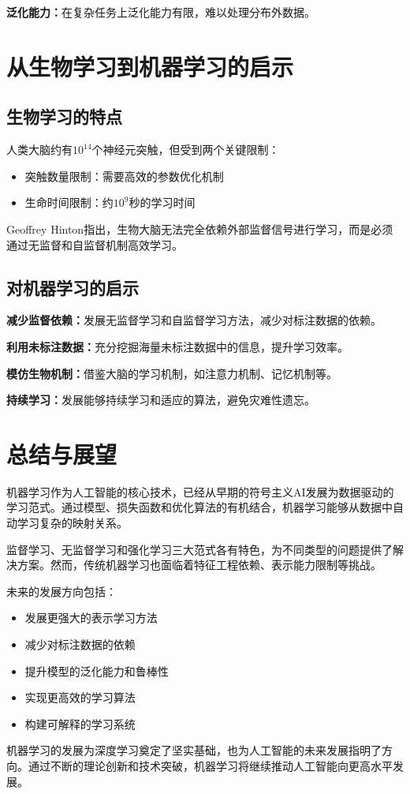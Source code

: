\textbf{泛化能力：}在复杂任务上泛化能力有限，难以处理分布外数据。

\section{从生物学习到机器学习的启示}

\subsection{生物学习的特点}

人类大脑约有$10^{14}$个神经元突触，但受到两个关键限制：
\begin{itemize}
\item 突触数量限制：需要高效的参数优化机制
\item 生命时间限制：约$10^9$秒的学习时间
\end{itemize}

Geoffrey Hinton指出，生物大脑无法完全依赖外部监督信号进行学习，而是必须通过无监督和自监督机制高效学习。

\subsection{对机器学习的启示}

\textbf{减少监督依赖：}发展无监督学习和自监督学习方法，减少对标注数据的依赖。

\textbf{利用未标注数据：}充分挖掘海量未标注数据中的信息，提升学习效率。

\textbf{模仿生物机制：}借鉴大脑的学习机制，如注意力机制、记忆机制等。

\textbf{持续学习：}发展能够持续学习和适应的算法，避免灾难性遗忘。

\section{总结与展望}

机器学习作为人工智能的核心技术，已经从早期的符号主义AI发展为数据驱动的学习范式。通过模型、损失函数和优化算法的有机结合，机器学习能够从数据中自动学习复杂的映射关系。

监督学习、无监督学习和强化学习三大范式各有特色，为不同类型的问题提供了解决方案。然而，传统机器学习也面临着特征工程依赖、表示能力限制等挑战。

未来的发展方向包括：
\begin{itemize}
\item 发展更强大的表示学习方法
\item 减少对标注数据的依赖
\item 提升模型的泛化能力和鲁棒性
\item 实现更高效的学习算法
\item 构建可解释的学习系统
\end{itemize}

机器学习的发展为深度学习奠定了坚实基础，也为人工智能的未来发展指明了方向。通过不断的理论创新和技术突破，机器学习将继续推动人工智能向更高水平发展。

\nocite{*}
\printbibliography[heading=bibintoc, title=\ebibname]